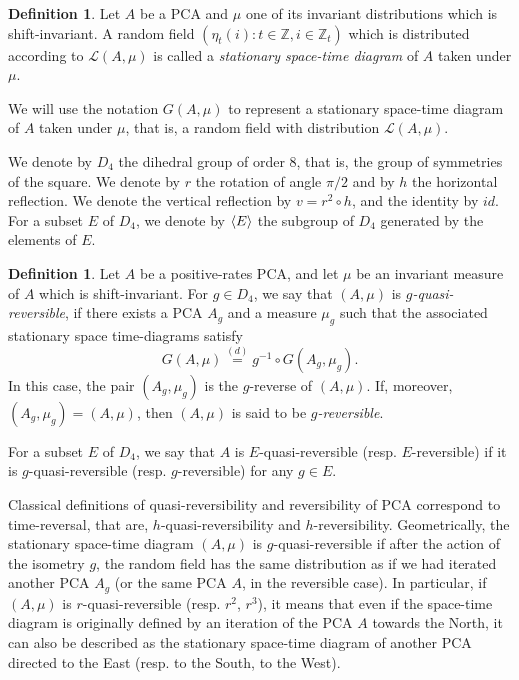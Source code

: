 \documentclass[10pt]{amsart}
\theoremstyle{definition}\newtheorem{defi}[theo]{Definition}\newtheorem{rema}[theo]{Remark}\newtheorem{exam}[theo]{Example}\newtheorem{exem}[theo]{Example}\newtheorem{nota}[theo]{Notation}
\DeclarePairedDelimiter{\vect}{\langle}{\rangle}
\newcounter{a}
\newcommand{\eqd}{\stackrel{(d)}{=}}
\newcommand{\ZZ}{\mathbb{Z}}
\renewcommand{\L}{\mathcal{L}}
\begin{document}
\begin{defi}\label{def:std}
Let $A$ be a PCA and $\mu$ one of its invariant distributions which is shift-invariant. A random field $(\eta_t(i) : t \in \ZZ, i \in \ZZ_t)$ which is distributed according to $\L(A,\mu)$ is called a \emph{stationary space-time diagram} of $A$ taken under $\mu$.
\end{defi}

We will use the notation $G(A,\mu)$ to represent a stationary space-time diagram of $A$ taken under $\mu$, that is, a random field with distribution $\L(A,\mu)$.

We denote by $D_4$ the dihedral group of order $8$, that is, the group of symmetries of the square. We denote by $r$ the rotation of angle $\pi/2$ and by $h$ the horizontal reflection. We denote the vertical reflection by $v=r^2\circ h$, and the identity by $id$. For a subset $E$ of $D_4$, we denote by $\vect{E}$ the subgroup of $D_4$ generated by the elements of $E$.

\begin{defi}\label{def:rev}
Let $A$ be a positive-rates PCA, and let $\mu$ be an invariant measure of $A$ which is shift-invariant. For $g \in D_4$, we say that $(A,\mu)$ is \emph{$g$-quasi-reversible}, if there exists a PCA $A_g$ and a measure $\mu_g$ such that the associated stationary space time-diagrams satisfy
\[
{G(A,\mu) \eqd g^{-1} \circ G(A_g,\mu_g)}.
\]
In this case, the pair $(A_g,\mu_g)$ is the $g$-reverse of $(A,\mu)$. If, moreover, $(A_g,\mu_g)=(A,\mu)$, then $(A,\mu)$ is said to be \emph{$g$-reversible}.

For a subset $E$ of $D_4$, we say that $A$ is $E$-quasi-reversible (resp. $E$-reversible) if it is $g$-quasi-reversible (resp. $g$-reversible) for any $g\in E$.
\end{defi}

Classical definitions of quasi-reversibility and reversibility of PCA correspond to time-reversal, that are, $h$-quasi-reversibility and $h$-reversibility. Geometrically, the stationary space-time diagram $(A,\mu)$ is $g$-quasi-reversible if after the action of the isometry $g$, the random field has the same distribution as if we had iterated another PCA $A_g$ (or the same PCA $A$, in the reversible case). In particular, if $(A,\mu)$ is $r$-quasi-reversible (resp. $r^2$, $r^3$), it means that even if the space-time diagram is originally defined by an iteration of the PCA $A$ towards the North, it can also be described as the stationary space-time diagram of another PCA directed to the East (resp. to the South, to the West).
\end{document}
